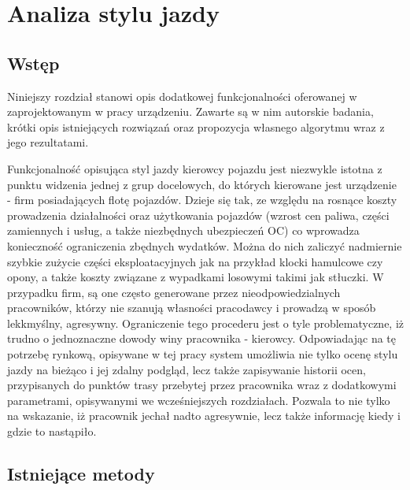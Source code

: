\chapter{Analiza stylu jazdy}

\section{Wstęp}

Niniejszy rozdział stanowi opis dodatkowej funkcjonalności oferowanej w zaprojektowanym w pracy urządzeniu. Zawarte są w nim autorskie badania, krótki opis istniejących rozwiązań oraz propozycja własnego algorytmu wraz z jego rezultatami. 

Funkcjonalność opisująca styl jazdy kierowcy pojazdu jest niezwykle istotna z punktu widzenia jednej z grup docelowych, do których kierowane jest urządzenie - firm posiadających flotę pojazdów. Dzieje się tak, ze względu na rosnące koszty prowadzenia działalności oraz użytkowania pojazdów (wzrost cen paliwa, części zamiennych i usług, a także niezbędnych ubezpieczeń OC) co wprowadza konieczność ograniczenia zbędnych wydatków. Można do nich zaliczyć nadmiernie szybkie zużycie części eksploatacyjnych jak na przykład klocki hamulcowe czy opony, a także koszty związane z wypadkami losowymi takimi jak stłuczki. W przypadku firm, są one często generowane przez nieodpowiedzialnych pracowników, którzy nie szanują własności pracodawcy i prowadzą w sposób lekkmyślny, agresywny. Ograniczenie tego procederu jest o tyle problematyczne, iż trudno o jednoznaczne dowody winy pracownika - kierowcy. Odpowiadając na tę potrzebę rynkową, opisywane w tej pracy system umożliwia nie tylko ocenę stylu jazdy na bieżąco i jej zdalny podgląd, lecz także zapisywanie historii ocen, przypisanych do punktów trasy przebytej przez pracownika wraz z dodatkowymi parametrami, opisywanymi we wcześniejszych rozdziałach. Pozwala to nie tylko na wskazanie, iż pracownik jechał nadto agresywnie, lecz także informację kiedy i gdzie to nastąpiło.

\section{Istniejące metody}


